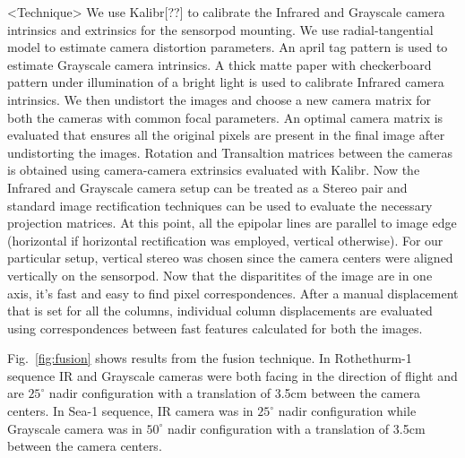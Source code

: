 \documentclass[runningheads]{llncs}
\begin{document}
<Technique>
We use Kalibr[??] to calibrate the Infrared and Grayscale camera intrinsics and extrinsics for the sensorpod mounting. We use radial-tangential model to estimate camera distortion parameters. An april tag pattern is used to estimate Grayscale camera intrinsics. A thick matte paper with checkerboard pattern under illumination of a bright light is used to calibrate Infrared camera intrinsics. We then undistort the images and choose a new camera matrix for both the cameras with common focal parameters. An optimal camera matrix is evaluated that ensures all the original pixels are present in the final image after undistorting the images. Rotation and Transaltion matrices between the cameras is obtained using camera-camera extrinsics evaluated with Kalibr. Now the Infrared and Grayscale camera setup can be treated as a Stereo pair and standard image rectification techniques can be used to evaluate the necessary projection matrices. At this point, all the epipolar lines are parallel to image edge (horizontal if horizontal rectification was employed, vertical otherwise). For our particular setup, vertical stereo was chosen since the camera centers were aligned vertically on the sensorpod. Now that the disparitites of the image are in one axis, it's fast and easy to find pixel correspondences. After a manual displacement that is set for all the columns, individual column displacements are evaluated using correspondences between fast features calculated for both the images.


Fig.~\ref{fig:fusion} shows results from the fusion technique. In Rothethurm-1 sequence IR and Grayscale cameras were both facing in the direction of flight and are $25^{\circ}$ nadir configuration with a translation of 3.5cm between the camera centers. In Sea-1 sequence, IR camera was in $25^{\circ}$ nadir configuration while Grayscale camera was in $50^{\circ}$ nadir configuration with a translation of 3.5cm between the camera centers.
\end{document}
